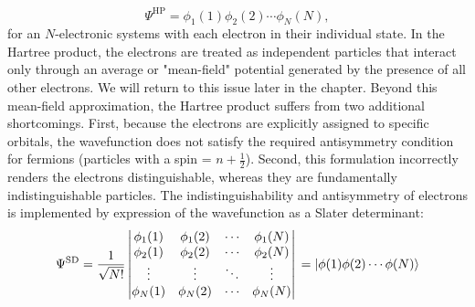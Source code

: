 \begin{equation}
   \Psi^{\mathrm{HP}} = \phi_{1}(1)\phi_{2}(2)\cdots \phi_{N}(N),
    \label{eq:Hartree_product}
\end{equation}
for an $N$-electronic systems with each electron in their individual state. In the Hartree product, the electrons are treated as independent particles that interact only through an average or "mean-field" potential generated by the presence of all other electrons. We will return to this issue later in the chapter. Beyond this mean-field approximation, the Hartree product suffers from two additional shortcomings. First, because the electrons are explicitly assigned to specific orbitals, the wavefunction does not satisfy the required antisymmetry condition for fermions (particles with a spin = $n + \frac{1}{2}$). Second, this formulation incorrectly renders the electrons distinguishable, whereas they are fundamentally indistinguishable particles. The indistinguishability and antisymmetry of electrons is implemented by expression of the wavefunction as a Slater determinant:
\begin{equation}
\Psi^{\mathrm{SD}} = \frac{1}{\sqrt{N!}}
\begin{vmatrix}
\phi_{1}(1) & \phi_{1}(2) &  \cdots & \phi_{1}(N) \\ 
\phi_{2}(1) & \phi_{2}(2) &  \cdots & \phi_{2}(N) \\
\vdots &  \vdots & \ddots &\vdots \\
\phi_{N}(1) & \phi_{N}(2) &  \cdots & \phi_{N}(N)\\ 
\end{vmatrix}\\
= \ket{\phi(1)\phi(2)\cdots\phi(N)}
\end{equation}

